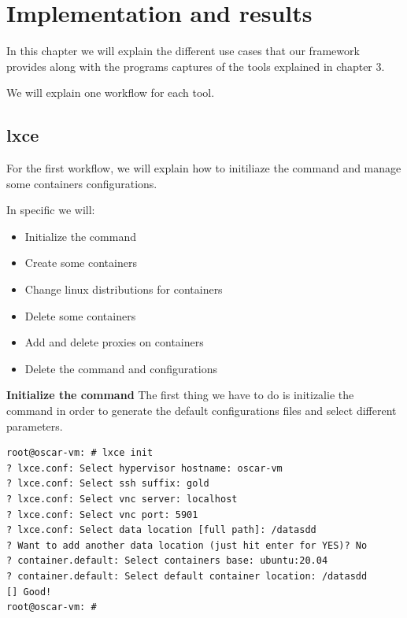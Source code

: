 \clearpage\section{Implementation and results}

In this chapter we will explain the different use cases that our framework provides along with the programs captures of the tools explained in chapter 3.

We will explain one workflow for each tool.

\subsection{lxce}
For the first workflow, we will explain how to initiliaze the command and manage some containers configurations.

In specific we will:
\begin{itemize}
	\item{Initialize the command}
	\item{Create some containers}
	\item{Change linux distributions for containers}
	\item{Delete some containers}
	\item{Add and delete proxies on containers}
	\item{Delete the command and configurations}
\end{itemize}

\textbf{Initialize the command}
The first thing we have to do is initizalie the command in order to generate the default configurations files and select different parameters.

\begin{verbatim}
root@oscar-vm: # lxce init
? lxce.conf: Select hypervisor hostname: oscar-vm
? lxce.conf: Select ssh suffix: gold
? lxce.conf: Select vnc server: localhost
? lxce.conf: Select vnc port: 5901
? lxce.conf: Select data location [full path]: /datasdd
? Want to add another data location (just hit enter for YES)? No
? container.default: Select containers base: ubuntu:20.04
? container.default: Select default container location: /datasdd
[] Good!
root@oscar-vm: #
\end{verbatim}

